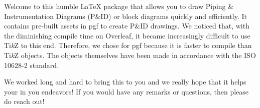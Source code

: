 Welcome to this humble LaTeX package that allows you to draw Piping \& Instrumentation Diagrams (P\&ID) or block diagrams quickly and efficiently. 
It contains pre-built assets in pgf to create P\&ID drawings. 
We noticed that, with the diminishing compile time on Overleaf, it became increasingly difficult to use Ti\emph{k}Z to this end. 
Therefore, we chose for pgf because it is faster to compile than Ti\emph{k}Z objects. 
The objects themselves have been made in accordance with the ISO 10628-2 standard. 

We worked long and hard to bring this to you and we really hope that it helps your in you endeavors! 
If you would have any remarks or questions, then please do reach out! 
